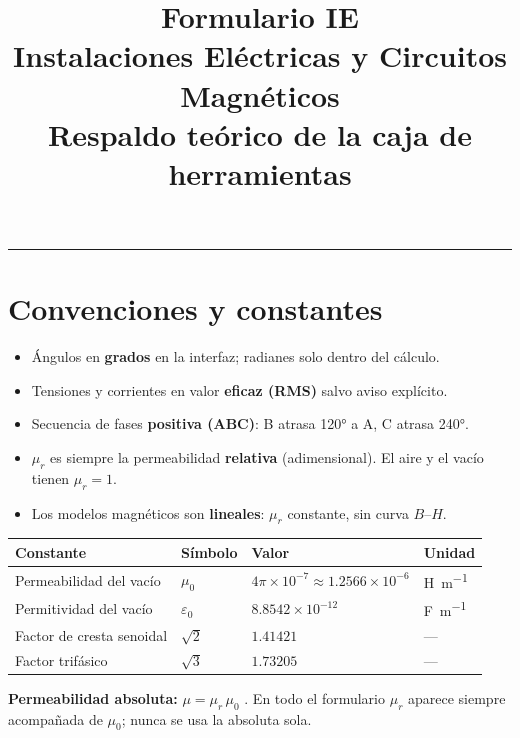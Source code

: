 \documentclass[11pt,a4paper]{article}
\title{\textbf{Formulario IE}\\[2mm]
\large Instalaciones Eléctricas y Circuitos Magnéticos\\
\normalsize Respaldo teórico de la caja de herramientas \fn{IE.m}}
\author{}
\date{}
\newcommand{\mur}{\mu_r}
\newcommand{\muz}{\mu_0}
\begin{document}
\maketitle
\vspace{-15mm}
\tableofcontents
\bigskip
\hrule
\bigskip

\section{Convenciones y constantes}

\begin{itemize}[nosep,leftmargin=*]
  \item Ángulos en \textbf{grados} en la interfaz; radianes solo dentro del cálculo.
  \item Tensiones y corrientes en valor \textbf{eficaz (RMS)} salvo aviso explícito.
  \item Secuencia de fases \textbf{positiva (ABC)}: B atrasa \ang{120} a A, C atrasa \ang{240}.
  \item $\mur$ es siempre la permeabilidad \textbf{relativa} (adimensional). El aire y el vacío tienen $\mur = 1$.
  \item Los modelos magnéticos son \textbf{lineales}: $\mur$ constante, sin curva $B$--$H$.
\end{itemize}

\begin{table}[h]
\centering
\begin{tabular}{@{}llll@{}}
\toprule
\textbf{Constante} & \textbf{Símbolo} & \textbf{Valor} & \textbf{Unidad} \\
\midrule
Permeabilidad del vacío   & $\muz$      & $4\pi\times10^{-7} \approx 1.2566\times10^{-6}$ & \unit{\henry\per\metre} \\
Permitividad del vacío    & $\varepsilon_0$ & $8.8542\times10^{-12}$ & \unit{\farad\per\metre} \\
Factor de cresta senoidal & $\sqrt{2}$  & $1.41421$ & --- \\
Factor trifásico          & $\sqrt{3}$  & $1.73205$ & --- \\
\bottomrule
\end{tabular}
\end{table}

\noindent\textbf{Permeabilidad absoluta:} $\mu = \mur\,\muz$ \; [\unit{\henry\per\metre}]. En todo el formulario
$\mur$ aparece siempre acompañada de $\muz$; nunca se usa la absoluta sola.
\end{document}

